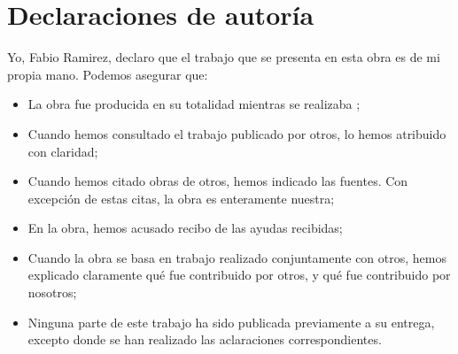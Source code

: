 \chapter*{Declaraciones de autoría}

Yo, Fabio Ramirez, declaro que el trabajo que se presenta en esta obra es de mi propia mano. Podemos asegurar que:

\begin{itemize}
  \item La obra fue producida en su totalidad mientras se realizaba ;
  \item Cuando hemos consultado el trabajo publicado por otros, lo hemos atribuido con claridad;
  \item Cuando hemos citado obras de otros, hemos indicado las fuentes. Con excepción de estas citas, la obra es enteramente
nuestra;
  \item En la obra, hemos acusado recibo de las ayudas recibidas;
  \item Cuando la obra se basa en trabajo realizado conjuntamente con otros, hemos explicado claramente qué fue contribuido por otros, y qué fue contribuido por nosotros;
  \item Ninguna parte de este trabajo ha sido publicada previamente a su entrega, excepto donde se han realizado las aclaraciones correspondientes.
\end{itemize}